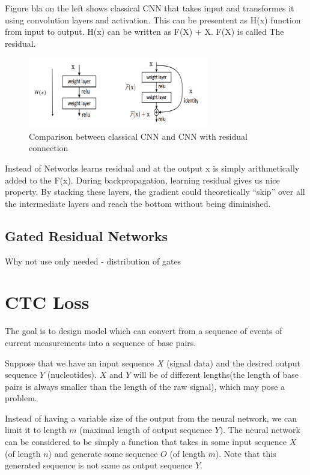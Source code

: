 \documentclass[times, utf8, diplomski, numeric, english]{fer}
\begin{document}
Figure bla on the left shows classical CNN that takes input and transformes it using convolution layers and activation. 
This can be presentent as H(x) function from input to output. 
H(x) can be written as F(X) + X.  F(X) is called The residual.
\begin{figure}[!ht]
	\begin{center}
		\includegraphics[width=0.7\textwidth]{./imgs/resnet_block.png}
		\caption[Comparison between classical CNN and CNN with residual connection ]{Comparison between classical CNN and CNN with residual connection \protect\footnotemark}
		\label{fg:receptive field}
	\end{center}
\end{figure}
Instead of Networks learns residual and at the output x is simply arithmetically added to the F(x). 
During backpropagation, learning residual gives us nice property. By stacking these layers, the gradient could theoretically “skip” over all the intermediate layers and reach the bottom without being diminished.


\subsection{Gated Residual Networks}
Why not use only needed - distribution of gates

\section{CTC Loss}

The goal is to design model which can convert from a sequence of events of current measurements into a sequence of base pairs.

Suppose that we have an input sequence $X$ (signal data) and the desired output sequence $Y$ (nucleotides). $X$ and $Y$ will be of different lengths(the length of base pairs is always smaller than the length of the raw signal), which may pose a problem.

Instead of having a variable size of the output from the neural network, we can limit it to length $m$ (maximal length of output sequence $Y$).
The neural network can be considered to be simply a function that takes in some input sequence $X$ (of length $n$) and generate some sequence $O$ (of length $m$). Note that this generated sequence is not same as output sequence $Y$. 
\end{document}
